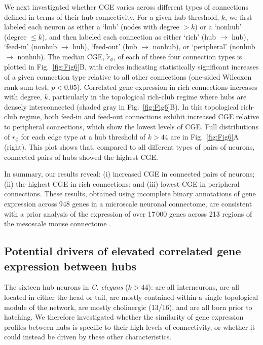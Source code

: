 \documentclass[10pt,letterpaper]{article}
\begin{document}
We next investigated whether CGE varies across different types of connections defined in terms of their hub connectivity.
For a given hub threshold, $k$, we first labeled each neuron as either a `hub' (nodes with degree $> k$) or a `nonhub' (degree $\leq k$), and then labeled each connection as either `rich' (hub $\rightarrow$ hub), `feed-in' (nonhub $\rightarrow$ hub), `feed-out' (hub $\rightarrow$ nonhub), or `peripheral' (nonhub $\rightarrow$ nonhub).
The median CGE, $\tilde{r}_\phi$, of each of these four connection types is plotted in Fig.~\ref{fig:Fig6}B, with circles indicating statistically significant increases of a given connection type relative to all other connections (one-sided Wilcoxon rank-sum test, $p < 0.05$).
Correlated gene expression in rich connections increases with degree, $k$, particularly in the topological rich-club regime where hubs are densely interconnected (shaded gray in Fig.~\ref{fig:Fig6}B).
In this topological rich-club regime, both feed-in and feed-out connections exhibit increased CGE relative to peripheral connections, which show the lowest levels of CGE.
Full distributions of $r_\phi$ for each edge type at a hub threshold of $k > 44$ are in Fig.~\ref{fig:Fig6}A (right).
This plot shows that, compared to all different types of pairs of neurons, connected pairs of hubs showed the highest CGE.

In summary, our results reveal:
(i) increased CGE in connected pairs of neurons;
(ii) the highest CGE in rich connections; and
(iii) lowest CGE in peripheral connections.
These results, obtained using incomplete binary annotations of gene expression across 948 genes in a microscale neuronal connectome, are consistent with a prior analysis of the expression of over 17\,000 genes across 213 regions of the mesoscale mouse connectome \cite{Fulcher:2016ck}.

\subsection*{Potential drivers of elevated correlated gene expression between hubs}
The sixteen hub neurons in \emph{C. elegans} ($k > 44$):
are all interneurons,
are all located in either the head or tail,
are mostly contained within a single topological module of the network,
are mostly cholinergic (13/16),
and are all born prior to hatching.
We therefore investigated whether the similarity of gene expression profiles between hubs is specific to their high levels of connectivity, or whether it could instead be driven by these other characteristics.
\end{document}
